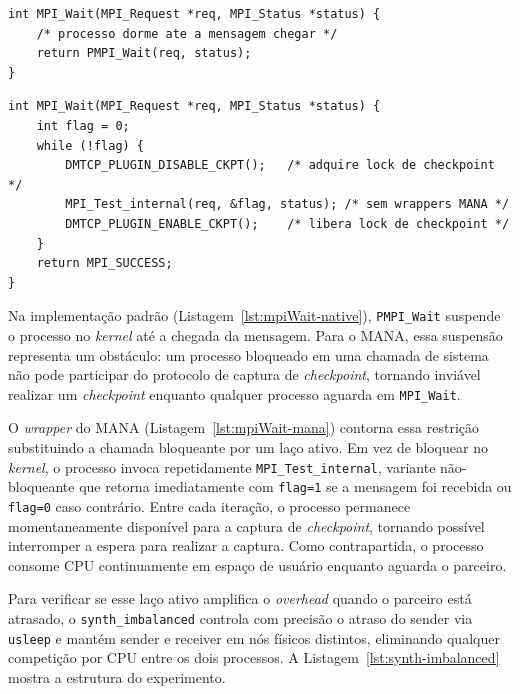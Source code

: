 \begin{listing}[htb]
  \caption{\texttt{MPI\_Wait} padrão: processo suspende no \textit{kernel} até
           a mensagem chegar.}
  \label{lst:mpiWait-native}
  \begin{verbatim}
int MPI_Wait(MPI_Request *req, MPI_Status *status) {
    /* processo dorme ate a mensagem chegar */
    return PMPI_Wait(req, status);
}
  \end{verbatim}
\end{listing}

\begin{listing}[htb]
  \caption{\texttt{MPI\_Wait} no MANA (simplificado): laço ativo com janelas de
           \textit{checkpoint}.}
  \label{lst:mpiWait-mana}
  \begin{verbatim}
int MPI_Wait(MPI_Request *req, MPI_Status *status) {
    int flag = 0;
    while (!flag) {
        DMTCP_PLUGIN_DISABLE_CKPT();   /* adquire lock de checkpoint */
        MPI_Test_internal(req, &flag, status); /* sem wrappers MANA */
        DMTCP_PLUGIN_ENABLE_CKPT();    /* libera lock de checkpoint */
    }
    return MPI_SUCCESS;
}
  \end{verbatim}
\end{listing}

Na implementação padrão (Listagem~\ref{lst:mpiWait-native}), \texttt{PMPI\_Wait}
suspende o processo no \textit{kernel} até a chegada da mensagem. Para o MANA, essa
suspensão representa um obstáculo: um processo bloqueado em uma chamada de sistema não
pode participar do protocolo de captura de \textit{checkpoint}, tornando inviável
realizar um \textit{checkpoint} enquanto qualquer processo aguarda em
\texttt{MPI\_Wait}.

O \textit{wrapper} do MANA (Listagem~\ref{lst:mpiWait-mana}) contorna essa restrição
substituindo a chamada bloqueante por um laço ativo. Em vez de bloquear no
\textit{kernel}, o processo invoca repetidamente \texttt{MPI\_Test\_internal}, variante
não-bloqueante que retorna imediatamente com \texttt{flag=1} se a mensagem foi recebida
ou \texttt{flag=0} caso contrário. Entre cada iteração, o processo permanece
momentaneamente disponível para a captura de \textit{checkpoint}, tornando possível
interromper a espera para realizar a captura. Como contrapartida, o processo consome
CPU continuamente em espaço de usuário enquanto aguarda o parceiro.

Para verificar se esse laço ativo amplifica o \textit{overhead} quando o parceiro está
atrasado, o \texttt{synth\_imbalanced} controla com precisão o atraso do sender via
\texttt{usleep} e mantém sender e receiver em nós físicos distintos, eliminando qualquer
competição por CPU entre os dois processos. A Listagem~\ref{lst:synth-imbalanced} mostra
a estrutura do experimento.

